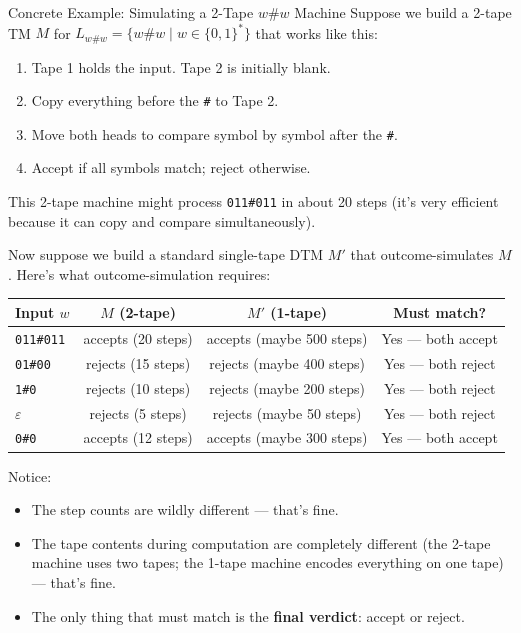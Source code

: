 \begin{examplebox}{Concrete Example: Simulating a 2-Tape $w\#w$ Machine}
Suppose we build a 2-tape TM $M$ for $L_{w\#w} = \{w\#w \mid w \in \{0,1\}^*\}$
that works like this:
\begin{enumerate}[nosep]
\item Tape 1 holds the input. Tape 2 is initially blank.
\item Copy everything before the \texttt{\#} to Tape 2.
\item Move both heads to compare symbol by symbol after the \texttt{\#}.
\item Accept if all symbols match; reject otherwise.
\end{enumerate}

This 2-tape machine might process \texttt{011\#011} in about 20 steps (it's
very efficient because it can copy and compare simultaneously).

Now suppose we build a standard single-tape DTM $M'$ that outcome-simulates
$M$. Here's what outcome-simulation requires:

\begin{center}
\renewcommand{\arraystretch}{1.3}
\begin{tabular}{lccc}
\toprule
\textbf{Input $w$} & \textbf{$M$ (2-tape)} & \textbf{$M'$ (1-tape)} & \textbf{Must match?} \\
\midrule
\texttt{011\#011} & accepts (20 steps) & accepts (maybe 500 steps) & Yes --- both accept \\
\texttt{01\#00} & rejects (15 steps) & rejects (maybe 400 steps) & Yes --- both reject \\
\texttt{1\#0} & rejects (10 steps) & rejects (maybe 200 steps) & Yes --- both reject \\
\texttt{$\varepsilon$} & rejects (5 steps) & rejects (maybe 50 steps) & Yes --- both reject \\
\texttt{0\#0} & accepts (12 steps) & accepts (maybe 300 steps) & Yes --- both accept \\
\bottomrule
\end{tabular}
\end{center}

Notice:
\begin{itemize}[nosep]
\item The step counts are wildly different --- that's fine.
\item The tape contents during computation are completely different (the 2-tape
  machine uses two tapes; the 1-tape machine encodes everything on one tape) ---
  that's fine.
\item The only thing that must match is the \textbf{final verdict}: accept or reject.
\end{itemize}
\end{examplebox}

